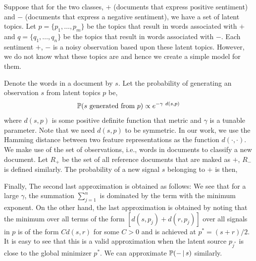 \documentclass[11pt, letterpaper, conference, final, twocolumn]{ieeeconf}
\begin{document}
Suppose that for the two classes, $+$ (documents that express positive sentiment) and $-$ (documents that express a negative sentiment), we have a set of latent topics. Let $p = \{ p_1, \ldots, p_m \}$ be the topics that result in words associated with $+$ and $q = \{ q_1, \ldots, q_n \}$ be the topics that result in words associated with $-$. Each sentiment $+$, $-$ is a noisy observation based upon these latent topics. However, we do not know what these topics are and hence we create a simple model for them.

Denote the words in a document by $s$. Let the probability of generating an observation $s$ from latent topics $p$ be,
$$
\mathbb{P}(s\ \textrm{generated from}\ p) \propto e^{-\gamma\ d(s, p)}
$$
where $d(s,p)$ is some positive definite function that metric and $\gamma$ is a tunable parameter. Note that we need $d(s,p)$ to be symmetric. In our work, we use the Hamming distance between two feature representations as the function $d(\cdot, \cdot)$. We make use of the set of observations, i.e., words in documents to classify a new document. Let $R_+$ be the set of all reference documents that are maked as $+$, $R_-$ is defined similarly. The probability of a new signal $s$ belonging to $+$ is then,

Finally,
The second last approximation is obtained as follows: We see that for a large $\gamma$, the summation $\sum_{j=1}^n$ is dominated by the term with the minimum exponent. On the other hand, the last approximation is obtained by noting that the minimum over all terms of the form $[ d(s, p_j) + d(r, p_j)]$ over all signals in $p$ is of the form $C d(s,r)$ for some $C > 0$ and is achieved at $p^* = (s+r)/2$. It is easy to see that this is a valid approximation when the latent source $p_{j^*}$ is close to the global minimizer $p^*$. We can approximate $\mathbb{P}(- \, \vert \, s)$ similarly. 
\end{document}
